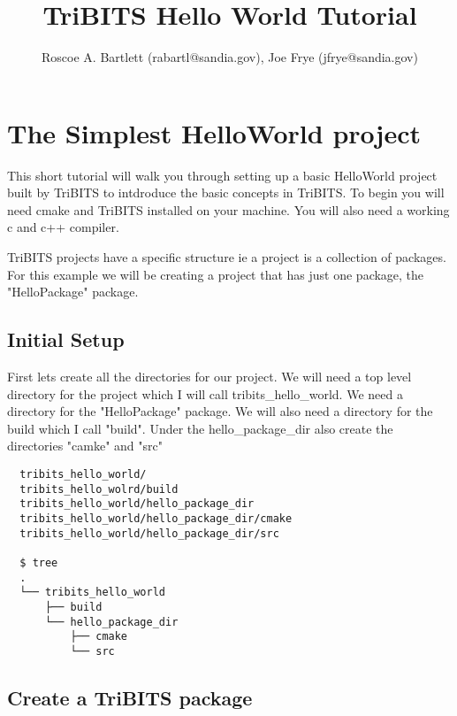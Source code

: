 \documentclass[12pt]{article}
\title{TriBITS Hello World Tutorial}
\author{Roscoe A. Bartlett 
 (rabartl@sandia.gov), Joe Frye (jfrye@sandia.gov)}
\begin{document}
\maketitle

\section*{The Simplest HelloWorld project}

This short tutorial will walk you through setting up a basic
HelloWorld project built by TriBITS to intdroduce the basic concepts
in TriBITS.  To begin you will need cmake and TriBITS installed on
your machine.  You will also need a working c and c++ compiler.

TriBITS projects have a specific structure ie a project is a
collection of packages.  For this example we will be creating a
project that has just one package, the "HelloPackage" package.

\subsection*{Initial Setup}

First lets create all the directories
for our project.  We will need a top level directory for the project
which I will call tribits\_hello\_world. We need a directory for the
"HelloPackage" package.  We will also need a directory for the build
which I call "build".  Under the hello\_package\_dir also create the
directories "camke" and "src"

\begin{verbatim}
  tribits_hello_world/
  tribits_hello_wolrd/build
  tribits_hello_world/hello_package_dir
  tribits_hello_world/hello_package_dir/cmake
  tribits_hello_world/hello_package_dir/src

  $ tree
  .
  └── tribits_hello_world
      ├── build
      └── hello_package_dir
          ├── cmake
          └── src
\end{verbatim}

\subsection*{Create a TriBITS package}
\end{document}
